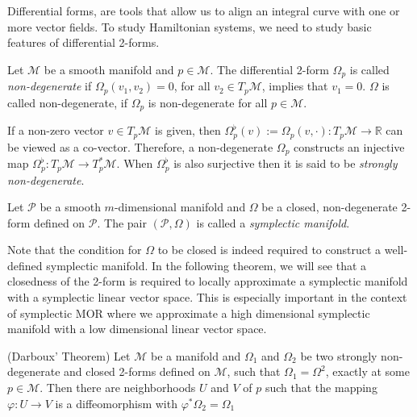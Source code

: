 Differential forms, are tools that allow us to align an integral curve with one or more vector fields. To study Hamiltonian systems, we need to study basic features of differential 2-forms.

\begin{definition}
	Let $\mathcal M$ be a smooth manifold and $p\in \mathcal M$. The differential 2-form $\Omega_p$ is called \emph{non-degenerate} if $\Omega_p(v_1,v_2)=0$, for all $v_2\in T_p \mathcal M$, implies that $v_1 = 0$. $\Omega$ is called non-degenerate, if $\Omega_p$ is non-degenerate for all $p\in \mathcal M$.
\end{definition}
If a non-zero vector $v\in T_p \mathcal M$ is given, then $\Omega_p^{\flat}(v):=\Omega_p(v,\cdot):T_p \mathcal M \to \mathbb R$ can be viewed as a co-vector. Therefore, a non-degenerate $\Omega_p$ constructs an injective map $\Omega_p^{\flat}:T_p\mathcal M \to T_p^* \mathcal M$. When $\Omega_p^{\flat}$ is also surjective then it is said to be \emph{strongly non-degenerate}. 

\begin{definition}
	Let $\mathcal P$ be a smooth $m$-dimensional manifold and $\Omega$ be a closed, non-degenerate 2-form defined on $\mathcal P$. The pair $(\mathcal P,\Omega)$ is called a \emph{symplectic manifold}.
\end{definition}
Note that the condition for $\Omega$ to be closed is indeed required to construct a well-defined symplectic manifold. In the following theorem, we will see that a closedness of the 2-form is required to locally approximate a symplectic manifold with a symplectic linear vector space. This is especially important in the context of symplectic MOR where we approximate a high dimensional symplectic manifold with a low dimensional linear vector space.

\begin{theorem} \label{theorem:2.5}
(Darboux' Theorem) Let $\mathcal M$ be a manifold and $\Omega_1$ and $\Omega_2$ be two strongly non-degenerate and closed 2-forms defined on $\mathcal M$, such that $\Omega_1 = \Omega^2$, exactly at some $p\in \mathcal M$. Then there are neighborhoods $U$ and $V$ of $p$ such that the mapping $\varphi:U\to V$ is a diffeomorphism with $\varphi^* \Omega_2 = \Omega_1$
\end{theorem}

